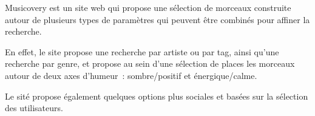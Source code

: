 Musicovery est un site web qui propose une sélection de morceaux construite
autour de plusieurs types de paramètres qui peuvent être combinés pour affiner
la recherche.

En effet, le site propose une recherche par artiste ou par tag, ainsi qu'une
recherche par genre, et propose au sein d'une sélection de places les morceaux
autour de deux axes d'humeur~: sombre/positif et énergique/calme.

Le sité propose également quelques options plus sociales et basées sur la
sélection des utilisateurs.
